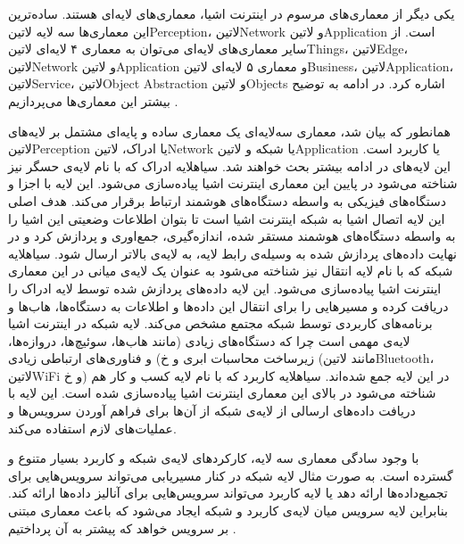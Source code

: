 یکی دیگر از معماری‌های مرسوم در اینترنت اشیا، معماری‌های لایه‌ای هستند. ساده‌ترین این معماری‌ها سه لایه ‌لاتین{Perception}، ‌لاتین{Network} و ‌لاتین{Application}
است. از سایر معماری‌های لایه‌ای می‌توان به معماری ۴ لایه‌ای ‌لاتین{Things}، ‌لاتین{Edge}، ‌لاتین{Network} و ‌لاتین{Application} و معماری ۵ لایه‌ای
‌لاتین{Business}، ‌لاتین{Application}، ‌لاتین{Service}، ‌لاتین{Object Abstraction} و ‌لاتین{Objects} اشاره کرد. در ادامه به توضیح بیشتر این معماری‌ها می‌پردازیم
.

همانطور که بیان شد، معماری سه‌لایه‌ای یک معماری ساده و پایه‌ای مشتمل بر لایه‌های ‌لاتین{Perception} یا ادراک، ‌لاتین{Network} یا شبکه و ‌لاتین{Application} یا کاربرد است.
این لایه‌های در ادامه بیشتر بحث خواهند شد.
 ‌سیاه{لایه ادراک} که با نام لایه‌ی حسگر نیز شناخته می‌شود در پایین این معماری اینترنت اشیا پیاده‌سازی می‌شود. این لایه با اجزا و دستگاه‌های فیزیکی به واسطه دستگاه‌های هوشمند ارتباط برقرار می‌کند.
هدف اصلی این لایه اتصال اشیا به شبکه اینترنت اشیا است تا بتوان اطلاعات وضعیتی این اشیا را به واسطه دستگاه‌های هوشمند مستقر شده، اندازه‌گیری، جمع‌اوری و پردازش کرد و در نهایت داده‌های پردازش شده به
وسیله‌ی رابط لایه، به لایه‌ی بالاتر ارسال شود.
 ‌سیاه{لایه شبکه} که با نام لایه انتقال نیز شناخته می‌شود به عنوان یک لایه‌ی میانی در این معماری اینترنت اشیا پیاده‌سازی می‌شود. این لایه داده‌های پردازش شده توسط لایه ادراک را دریافت کرده و
مسیرهایی را برای انتقال این داده‌ها و اطلاعات به دستگاه‌ها، هاب‌ها و برنامه‌های کاربردی توسط شبکه مجتمع مشخص می‌کند. لایه شبکه در اینترنت اشیا لایه‌ی مهمی است چرا که دستگاه‌های زیادی (مانند
هاب‌ها، سوئیچ‌ها، دروازه‌ها، زیرساخت محاسبات ابری و ‌خ) و فناوری‌های ارتباطی زیادی (مانند ‌لاتین{Bluetooth}، ‌لاتین{WiFi} و ‌خ) در این لایه جمع شده‌اند.
 ‌سیاه{لایه کاربرد} که با نام لایه کسب و کار هم شناخته می‌شود در بالای این معماری اینترنت اشیا پیاده‌سازی شده است. این لایه با دریافت داده‌های ارسالی از لایه‌ی شبکه از آن‌ها برای فراهم آوردن
سرویس‌ها و عملیات‌های لازم استفاده می‌کند.

با وجود سادگی معماری سه لایه، کارکردهای لایه‌ی شبکه و کاربرد بسیار متنوع و گسترده است. به صورت مثال لایه شبکه در کنار مسیریابی می‌تواند سرویس‌هایی برای تجمبع‌داده‌ها ارائه دهد یا لایه کاربرد
می‌تواند سرویس‌هایی برای آنالیز داده‌ها ارائه کند. بنابراین لایه سرویس میان لایه‌ی کاربرد و شبکه ایجاد می‌شود که باعث معماری مبتنی بر سرویس خواهد که پیشتر به آن پرداختیم
.


